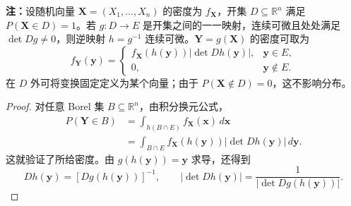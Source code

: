 \textbf{注：}\quad 设随机向量 $\boldsymbol X=(X_1,\ldots,X_n)$ 的密度为 $f_{\boldsymbol X}$，开集 $D\subseteq\mathbb R^n$ 满足 $P(\boldsymbol X\in D)=1$。若 $g:D\to E$ 是开集之间的一一映射，连续可微且处处满足 $\det Dg\ne0$，则逆映射 $h=g^{-1}$ 连续可微。$\boldsymbol Y=g(\boldsymbol X)$ 的密度可取为
\[
f_{\boldsymbol Y}(\boldsymbol y)=
\begin{cases}
f_{\boldsymbol X}(h(\boldsymbol y))|\det Dh(\boldsymbol y)|,
&\boldsymbol y\in E,\\
0,&\boldsymbol y\notin E.
\end{cases}
\]
在 $D$ 外可将变换固定定义为某个向量；由于 $P(\boldsymbol X\notin D)=0$，这不影响分布。

\begin{proof}
对任意 Borel 集 $B\subseteq\mathbb R^n$，由积分换元公式，
\begin{align*}
P(\boldsymbol Y\in B)
&=\int_{h(B\cap E)}f_{\boldsymbol X}(\boldsymbol x)\,d\boldsymbol x\\
&=\int_{B\cap E}f_{\boldsymbol X}(h(\boldsymbol y))
 |\det Dh(\boldsymbol y)|\,d\boldsymbol y.
\end{align*}
这就验证了所给密度。由 $g(h(\boldsymbol y))=\boldsymbol y$ 求导，还得到
\[
Dh(\boldsymbol y)=[Dg(h(\boldsymbol y))]^{-1},\qquad
|\det Dh(\boldsymbol y)|
=\frac{1}{|\det Dg(h(\boldsymbol y))|}.
\]
\end{proof}

